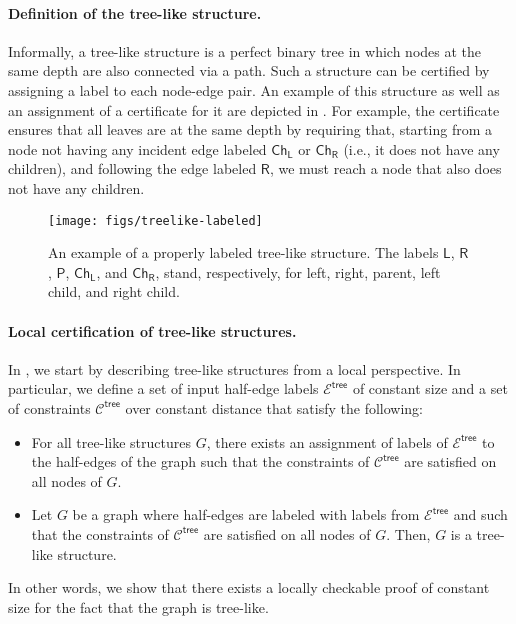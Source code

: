 \documentclass[11pt]{article}
\newcommand{\lparent}{\mathsf {P}}
\newcommand{\lleft}{\mathsf {L}}
\newcommand{\lright}{\mathsf {R}}
\newcommand{\llch}{\ensuremath{\mathsf {Ch_L}}}
\newcommand{\lrch}{\ensuremath{\mathsf {Ch_R}}}
\newcommand{\ltreelike}{\mathsf {tree}}
\begin{document}
\paragraph{Definition of the tree-like structure.}
Informally, a tree-like
structure is a perfect binary tree in which nodes at the same depth are also
connected via a path. Such a structure can be certified by assigning a label to
each node-edge pair.
An example of this structure as well as an assignment of a certificate for it
are depicted in . For example, the
certificate ensures that all leaves are at the same depth by requiring
that, starting from a node not having any incident edge labeled $\llch$ or
$\lrch$ (i.e., it does not have any children), and following the edge labeled
$\lright$, we must reach a node that also does not have any children.

\begin{figure}
	\centering
	\texttt{[image: figs/treelike-labeled]}
	\caption{An example of a properly labeled tree-like structure.
	The labels $\lleft$, $\lright$, $\lparent$, $\llch$, and $\lrch$, stand, respectively, for left, right, parent, left child, and right child.
	}\label{fig:treelike-labeled}
\end{figure}

\paragraph{Local certification of tree-like structures.}
In , we start by describing tree-like structures from a
local perspective. In particular, we define a set of input half-edge labels
$\mathcal{E}^{\ltreelike}$ of constant size and a set of constraints
$\mathcal{C}^{\ltreelike}$ over constant distance that satisfy the following:
\begin{itemize}
	\item For all tree-like structures $G$, there exists an assignment of labels of $\mathcal{E}^{\ltreelike}$ to the half-edges of the graph such that the constraints of $\mathcal{C}^{\ltreelike}$ are satisfied on all nodes of $G$.
	\item Let $G$ be a graph where half-edges are labeled with labels from
	$\mathcal{E}^{\ltreelike}$ and such that the constraints of
	$\mathcal{C}^{\ltreelike}$ are satisfied on all nodes of $G$. Then, $G$ is a
	tree-like structure.
\end{itemize}
In other words, we show that there exists a locally checkable proof of constant size for the fact that the graph is tree-like.
\end{document}

